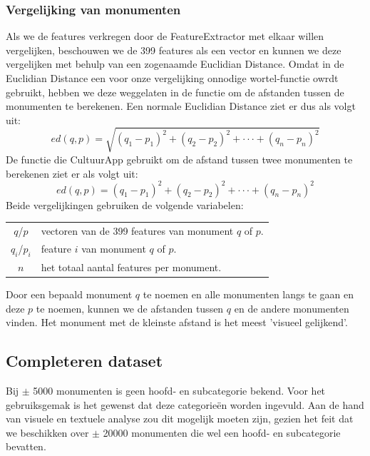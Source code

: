 \documentclass[a4paper,10pt]{article}
\begin{document}
		\subsubsection{Vergelijking van monumenten}
		Als we de features verkregen door de FeatureExtractor met elkaar willen vergelijken, beschouwen we de 399 features als een vector en kunnen we deze vergelijken met behulp van een zogenaamde Euclidian Distance. Omdat in de Euclidian Distance een voor onze vergelijking onnodige wortel-functie owrdt gebruikt, hebben we deze weggelaten in de functie om de afstanden tussen de monumenten te berekenen. Een normale Euclidian Distance ziet er dus als volgt uit:
		\begin{equation}
			ed(q, p) = \sqrt{(q_1 - p_1)^2 + (q_2 - p_2)^2 + \cdot\cdot\cdot + (q_n - p_n)^2}
		\end{equation}
		De functie die CultuurApp gebruikt om de afstand tussen twee monumenten te berekenen ziet er als volgt uit:
		\begin{equation}
			ed(q, p) = (q_1 - p_1)^2 + (q_2 - p_2)^2 + \cdot\cdot\cdot + (q_n - p_n)^2
		\end{equation}
		Beide vergelijkingen gebruiken de volgende variabelen:
		\begin{center}
			\begin{tabular}{ c | l }
				$q$/$p$ & vectoren van de 399 features van monument $q$ of $p$.\\
				$q_{i}$/$p_{i}$ & feature $i$ van monument $q$ of $p$.\\
				$n$ & het totaal aantal features per monument.
			\end{tabular}
		\end{center}
		
		Door een bepaald monument $q$ te noemen en alle monumenten langs te gaan en deze $p$ te noemen, kunnen we de afstanden tussen $q$ en de andere monumenten vinden. Het monument met de kleinste afstand is het meest 'visueel gelijkend'.
		
	\subsection{Completeren dataset}
	Bij $\pm$ 5000 monumenten is geen hoofd- en subcategorie bekend. Voor het gebruiksgemak is het gewenst dat deze categorie\"en worden ingevuld. Aan de hand van visuele en textuele analyse zou dit mogelijk moeten zijn, gezien het feit dat we beschikken over $\pm$ 20000 monumenten die wel een hoofd- en subcategorie bevatten.
	
\end{document}
